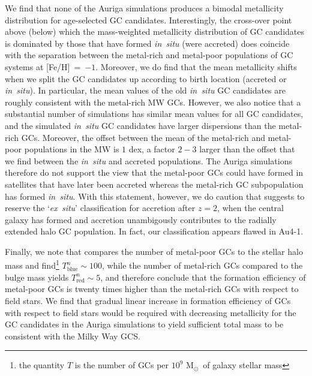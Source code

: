\documentclass[a4paper,fleqn,usenatbib]{mnras}
\newcommand{\Sun}[0]{\ensuremath{_{\odot}}}
\begin{document}
We find that none of the Auriga simulations produces a bimodal 
metallicity distribution for age-selected GC candidates. Interestingly, the 
cross-over point above (below) which the mass-weighted metallicity distribution
of GC candidates is dominated by those that have formed {\it in~situ} (were
accreted) does coincide with the separation between the metal-rich and metal-poor
populations of GC systems at [Fe/H]~=~$-1$. Moreover, we do find that the mean
metallicity shifts when we split the GC candidates up according to birth location
(accreted or {\it in~situ}). In particular, the mean values of the old 
{\it in~situ} GC candidates are roughly consistent with the metal-rich MW GCs.
However, we also notice that a substantial number of simulations has similar 
mean values for all GC candidates, and the simulated {\it in~situ} GC candidates 
have larger dispersions than the metal-rich GCs. Moreover, the offset between 
the mean of the metal-rich and metal-poor populations in the MW is $1$ dex, a
factor $2-3$ larger than the offset that we find between the {\it in~situ} and 
accreted populations. The Auriga simulations therefore do not support the view 
that the metal-poor GCs could have formed in satellites that have later been 
accreted whereas the metal-rich GC subpopulation has formed {\it in~situ}. With 
this statement, however, we do caution that \citet{2019MNRAS.486.3134K} suggests 
to reserve the `{\it ex~situ}' classification for accretion after $z=2$, when
the central galaxy has formed and accretion unambigously contributes to the
radially extended halo GC population. In fact, our classification appears flawed
in Au4-1.

Finally, we note that \citet{2006ARA&A..44..193B} compares the number of metal-poor 
GCs to the stellar halo mass and find\footnote{the quantity $T$ is the number of 
GCs per $10^9$ M\Sun \, of galaxy stellar mass} $T^n_{\text{blue}} \sim 100$, 
while the number of metal-rich GCs compared to the bulge mass yields 
$T^n_{\text{red}} \sim 5$, and therefore conclude that the formation efficiency
of metal-poor GCs is twenty times higher than the metal-rich GCs with respect to 
field stars. We find that gradual linear increase in formation efficiency of GCs
with respect to field stars would be required with decreasing metallicity for
the GC candidates in the Auriga simulations to yield sufficient total mass to
be consistent with the Milky Way GCS.
\end{document}
